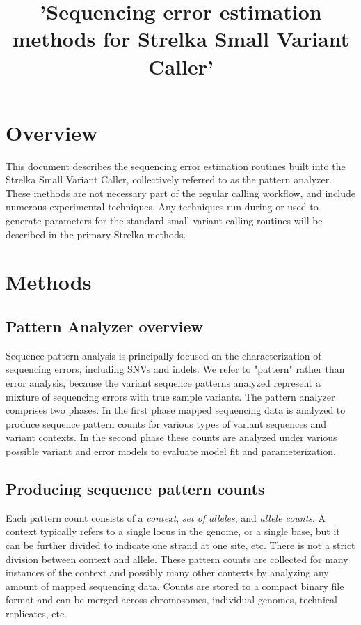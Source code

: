 \documentclass{article}
\title{'Sequencing error estimation methods for Strelka Small Variant Caller'}
\begin{document}
\maketitle

\tableofcontents

\section{Overview}

This document describes the sequencing error estimation routines built into the Strelka Small Variant Caller, collectively referred to as the pattern analyzer. These methods are not necessary part of the regular calling workflow, and include numerous experimental techniques. Any techniques run during or used to generate parameters for the standard small variant calling routines will be described in the primary Strelka methods.

\section{Methods}

\subsection{Pattern Analyzer overview}

Sequence pattern analysis is principally focused on the characterization of sequencing errors, including SNVs and indels. We refer to "pattern" rather than error analysis, because the variant sequence patterns analyzed represent a mixture of sequencing errors with true sample variants. The pattern analyzer comprises two phases. In the first phase mapped sequencing data is analyzed to produce sequence pattern counts for various types of variant sequences and variant contexts. In the second phase these counts are analyzed under various possible variant and error models to evaluate model fit and parameterization.

\subsection{Producing sequence pattern counts}

Each pattern count consists of a \emph{context}, \emph{set of alleles}, and \emph{allele counts}. A context typically refers to a single locus in the genome, or a single base, but it can be further divided to indicate one strand at one site, etc. There is not a strict division between context and allele. These pattern counts are collected for many instances of the context and possibly many other contexts by analyzing any amount of mapped sequencing data. Counts are stored to a compact binary file format and can be merged across chromosomes, individual genomes, technical replicates, etc.
\end{document}
